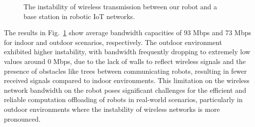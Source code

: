 \begin{figure}[htp]
    \centering
    \hfil
    \caption{The instability of wireless transmission between our robot and a base station in robotic IoT networks.}
    \label{fig:bandwidth} 
\end{figure}


The results in Fig.~\ref{fig:bandwidth} show average bandwidth capacities of 93 Mbps and 73 Mbps for indoor and outdoor scenarios, respectively. 
The outdoor environment exhibited higher instability, with bandwidth frequently dropping to extremely low values around 0 Mbps, due to the lack of walls to reflect wireless signals and the presence of obstacles like trees between communicating robots, resulting in fewer received signals compared to indoor environments. This limitation on the wireless network bandwidth on the robot poses significant challenges for the efficient and reliable computation offloading of robots in real-world scenarios, particularly in outdoor environments where the instability of wireless networks is more pronounced.

